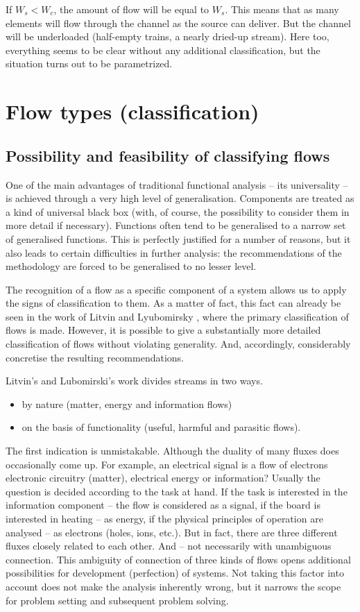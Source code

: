 \documentclass[a4paper,11pt]{article}
\begin{document}
If $W_s<W_c$, the amount of flow will be equal to $W_s$. This means that as
many elements will flow through the channel as the source can deliver. But the
channel will be underloaded (half-empty trains, a nearly dried-up stream).
Here too, everything seems to be clear without any additional classification,
but the situation turns out to be parametrized.

\section{Flow types (classification)}

\subsection{Possibility and feasibility of classifying flows}

One of the main advantages of traditional functional analysis -- its
universality -- is achieved through a very high level of
generalisation. Components are treated as a kind of universal black box (with,
of course, the possibility to consider them in more detail if necessary).
Functions often tend to be generalised to a narrow set of generalised
functions. This is perfectly justified for a number of reasons, but it also
leads to certain difficulties in further analysis: the recommendations of the
methodology are forced to be generalised to no lesser level.

The recognition of a flow as a specific component of a system allows us to
apply the signs of classification to them. As a matter of fact, this fact can
already be seen in the work of Litvin and Lyubomirsky \cite{B6}, where the
primary classification of flows is made. However, it is possible to give a
substantially more detailed classification of flows without violating
generality. And, accordingly, considerably concretise the resulting
recommendations.

Litvin's and Lubomirski's work divides streams in two ways.
\begin{itemize}
\item by nature (matter, energy and information flows)
\item on the basis of functionality (useful, harmful and parasitic flows).
\end{itemize}
The first indication is unmistakable. Although the duality of many fluxes does
occasionally come up. For example, an electrical signal is a flow of electrons
electronic circuitry (matter), electrical energy or information? Usually the
question is decided according to the task at hand. If the task is interested
in the information component -- the flow is considered as a signal, if the
board is interested in heating -- as energy, if the physical principles of
operation are analysed -- as electrons (holes, ions, etc.). But in fact, there
are three different fluxes closely related to each other. And -- not
necessarily with unambiguous connection. This ambiguity of connection of three
kinds of flows opens additional possibilities for development (perfection) of
systems. Not taking this factor into account does not make the analysis
inherently wrong, but it narrows the scope for problem setting and subsequent
problem solving.
\end{document}
